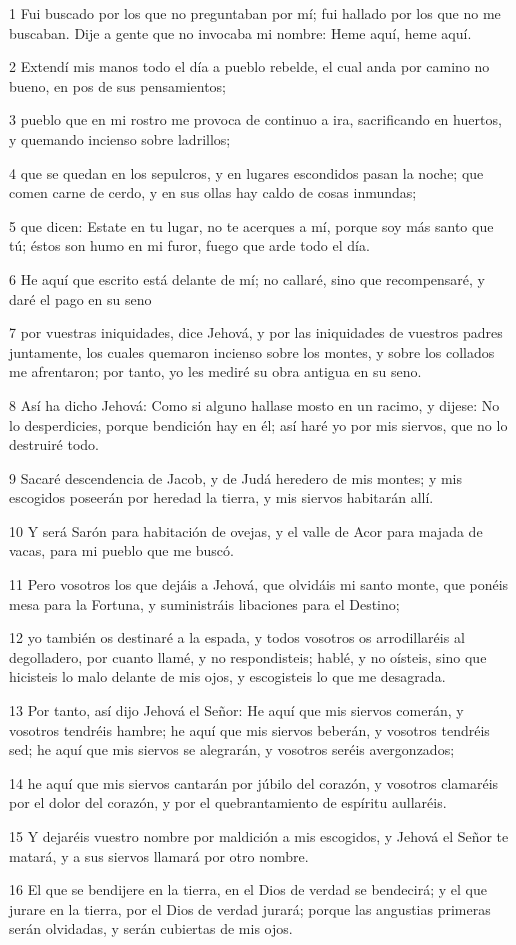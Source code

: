 \par 1 Fui buscado por los que no preguntaban por mí; fui hallado por los que no me buscaban. Dije a gente que no invocaba mi nombre: Heme aquí, heme aquí.
\par 2 Extendí mis manos todo el día a pueblo rebelde, el cual anda por camino no bueno, en pos de sus pensamientos;
\par 3 pueblo que en mi rostro me provoca de continuo a ira, sacrificando en huertos, y quemando incienso sobre ladrillos;
\par 4 que se quedan en los sepulcros, y en lugares escondidos pasan la noche; que comen carne de cerdo, y en sus ollas hay caldo de cosas inmundas;
\par 5 que dicen: Estate en tu lugar, no te acerques a mí, porque soy más santo que tú; éstos son humo en mi furor, fuego que arde todo el día.
\par 6 He aquí que escrito está delante de mí; no callaré, sino que recompensaré, y daré el pago en su seno
\par 7 por vuestras iniquidades, dice Jehová, y por las iniquidades de vuestros padres juntamente, los cuales quemaron incienso sobre los montes, y sobre los collados me afrentaron; por tanto, yo les mediré su obra antigua en su seno.
\par 8 Así ha dicho Jehová: Como si alguno hallase mosto en un racimo, y dijese: No lo desperdicies, porque bendición hay en él; así haré yo por mis siervos, que no lo destruiré todo.
\par 9 Sacaré descendencia de Jacob, y de Judá heredero de mis montes; y mis escogidos poseerán por heredad la tierra, y mis siervos habitarán allí.
\par 10 Y será Sarón para habitación de ovejas, y el valle de Acor para majada de vacas, para mi pueblo que me buscó.
\par 11 Pero vosotros los que dejáis a Jehová, que olvidáis mi santo monte, que ponéis mesa para la Fortuna, y suministráis libaciones para el Destino;
\par 12 yo también os destinaré a la espada, y todos vosotros os arrodillaréis al degolladero, por cuanto llamé, y no respondisteis; hablé, y no oísteis, sino que hicisteis lo malo delante de mis ojos, y escogisteis lo que me desagrada.
\par 13 Por tanto, así dijo Jehová el Señor: He aquí que mis siervos comerán, y vosotros tendréis hambre; he aquí que mis siervos beberán, y vosotros tendréis sed; he aquí que mis siervos se alegrarán, y vosotros seréis avergonzados;
\par 14 he aquí que mis siervos cantarán por júbilo del corazón, y vosotros clamaréis por el dolor del corazón, y por el quebrantamiento de espíritu aullaréis.
\par 15 Y dejaréis vuestro nombre por maldición a mis escogidos, y Jehová el Señor te matará, y a sus siervos llamará por otro nombre.
\par 16 El que se bendijere en la tierra, en el Dios de verdad se bendecirá; y el que jurare en la tierra, por el Dios de verdad jurará; porque las angustias primeras serán olvidadas, y serán cubiertas de mis ojos.

